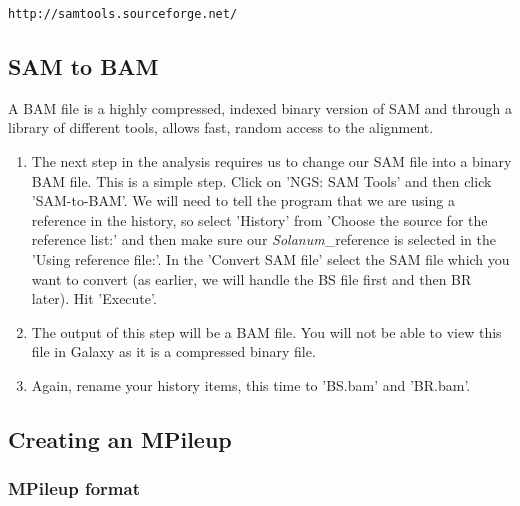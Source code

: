 \documentclass[12pt,a4paper]{article}
\begin{document}
\texttt{http://samtools.sourceforge.net/}

\subsection{SAM to BAM}

A BAM file is a highly compressed, indexed binary version of SAM and
through a library of different tools, allows fast, random access to
the alignment.
\begin{enumerate}
	\item The next step in the analysis requires us to change our
          SAM file into a binary BAM file. This is a simple
          step. Click on 'NGS: SAM Tools' and then click
          'SAM-to-BAM'. We will need to tell the program that we are
          using a reference in the history, so select 'History' from
          'Choose the source for the reference list:' and then make
          sure our \emph{Solanum}\_reference is selected in the 'Using
          reference file:'. In the 'Convert SAM file' select the SAM
          file which you want to convert (as earlier, we will handle
          the BS file first and then BR later). Hit 'Execute'.
	\item The output of this step will be a BAM file. You will
          not be able to view this file in Galaxy as it is a
          compressed binary file.
	\item Again, rename your history items, this time to 'BS.bam'
          and 'BR.bam'.
\end{enumerate}

\subsection{Creating an MPileup}

\subsubsection{MPileup format}
\end{document}
